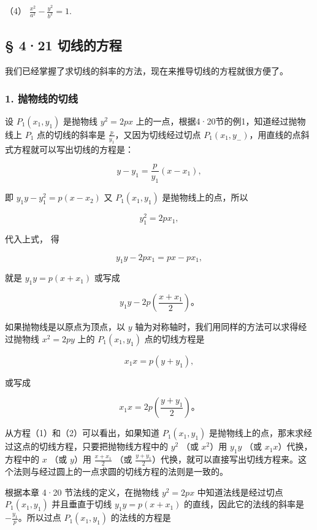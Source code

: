 （4） \(\frac{x^2}{a^2} - \frac{y^2}{b^2} = 1.\)

\subsection{§ 4·21 切线的方程}\label{ux5207ux7ebfux7684ux65b9ux7a0b}

我们已经掌握了求切线的斜率的方法，现在来推导切线的方程就很方便了。

\subsubsection{1.
抛物线的切线}\label{ux629bux7269ux7ebfux7684ux5207ux7ebf}

设 \(P_{1}(x_{1},y_{1})\) 是抛物线 \(y^{2} = 2px\)
上的一点，根据4·20节的例1，知道经过抛物线上 \(P_{1}\) 点的切线的斜率是
\(\frac{p}{y_1}\)，又因为切线经过切点
\(P_{1}(x_{1},y_{-})\)，用直线的点斜式方程就可以写出切线的方程是：

\[
y - y_{1} = \frac {p}{y_{1}} (x - x_{1}),
\]

即 \(y_{1}y - y_{1}^{2} = p(x - x_{2})\) 又 \(P_{1}(x_{1},y_{1})\)
是抛物线上的点，所以

\[
y_{1} ^ {2} = 2 p x_{1},
\]

代入上式， 得

\[
y_{1} y - 2 p x_{1} = p x - p x_{1},
\]

就是 \(y_{1}y = p(x + x_{1})\) 或写成

\[
y_{1} y - 2 p \left(\frac {x + x_{1}}{2}\right)\text{。} \tag {1}
\]

如果抛物线是以原点为顶点，以 \(y\)
轴为对称轴时，我们用同样的方法可以求得经过抛物线 \(x^{2} = 2py\) 上的
\(P_{1}(x_{1},y_{1})\) 点的切线方程是

\[
x_{1} x = p (y + y_{1}),
\]

或写成

\[
x_{1} x = 2 p \left(\frac {y + y_{1}}{2}\right)\text{。} \tag {2}
\]

从方程（1）和（2）可以看出，如果知道 \(P_{1}(x_{1},y_{1})\)
是抛物线上的点，那末求经过这点的切线方程，只要把抛物线方程中的 \(y^{2}\)
（或 \(x^{2}\)）用 \(y_{1}y\) （或 \(x_{1}x\)）代换，方程中的 \(x\) （或
\(y\)）用 \(\frac{x + x_1}{2}\) （或
\(\frac{y + y_1}{2}\)）代换，就可以直接写出切线方程来。这个法则与经过圆上的一点求圆的切线方程的法则是一致的。

根据本章 4·20 节法线的定义，在抛物线 \(y^{2}=2px\) 中知道法线是经过切点
\(P_{1}(x_{1},y_{1})\) 并且垂直于切线 \(y_{1}y=p(x+x_{1})\)
的直线，因此它的法线的斜率是 \(-\frac{y_{1}}{p}\)。所以过点
\(P_{1}(x_{1},y_{1})\) 的法线的方程是

